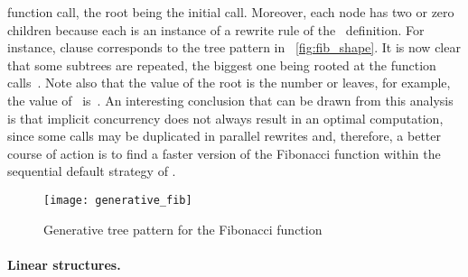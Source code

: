function call, the root being the initial call. Moreover, each node
has two or zero children because each is an instance of a rewrite rule
of the~ definition. For instance, clause \clause{\gamma}
corresponds to the tree pattern in \fig~\vref{fig:fib_shape}.  It is
now clear that some subtrees are repeated, the biggest one being
rooted at the function calls~. Note also that the
value of the root is the number or leaves, for example, the value
of~ is~. An interesting conclusion that can
be drawn from this analysis is that implicit concurrency does not
always result in an optimal computation, since some calls may be
duplicated in parallel rewrites and, therefore, a better course of
action is to find a faster version of the Fibonacci function within
the sequential default strategy of \Erlang.
\begin{figure}[H]
\centering
\texttt{[image: generative\_fib]}
\caption{Generative tree pattern for the Fibonacci
  function\label{fig:fib_shape}}
\end{figure}

\paragraph{Linear structures.}
\label{chap:lists}

